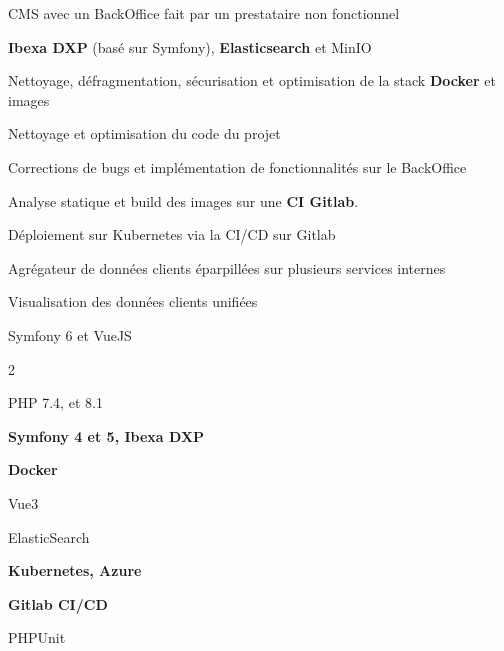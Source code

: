 \begin{cventries}
\begin{cvexperience}
		\begin{cvitems} %
			\item {CMS avec un BackOffice fait par un prestataire non fonctionnel}
			\item {\textbf{Ibexa DXP} (basé sur Symfony), \textbf{Elasticsearch} et MinIO}
			\item {Nettoyage, défragmentation, sécurisation et optimisation de la stack \textbf{Docker} et images}
			\item {Nettoyage et optimisation du code du projet}
			\item {Corrections de bugs et implémentation de fonctionnalités sur le BackOffice}
			\item {Analyse statique et build des images sur une \textbf{CI Gitlab}.}
			\item {Déploiement sur Kubernetes via la CI/CD sur Gitlab}
		\end{cvitems}

		\begin{cvitems}
			\item {Agrégateur de données clients éparpillées sur plusieurs services internes}
			\item {Visualisation des données clients unifiées}
			\item {Symfony 6 et VueJS}
		\end{cvitems}

		\vspace{-5mm}
		\begin{multicols}{2}
			\begin{cvitems}
				\item PHP 7.4, et 8.1
				\item \textbf{Symfony 4 et 5, Ibexa DXP}
				\item \textbf{Docker}
				\item Vue3
				\item ElasticSearch
				\item \textbf{Kubernetes, Azure}
				\item \textbf{Gitlab CI/CD}
				\item PHPUnit
			\end{cvitems}
		\end{multicols}
	\end{cvexperience}


\end{cventries}
